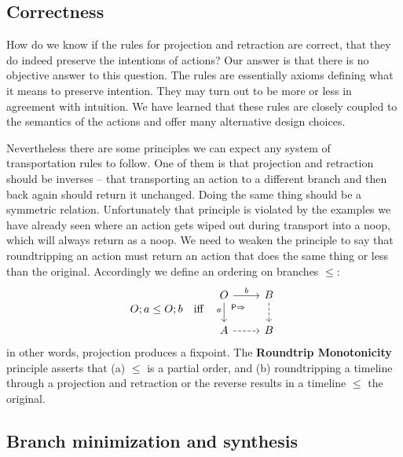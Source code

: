 \documentclass[english,submission]{programming}
\theoremstyle{definition}
\newcommand{\mathbox}[1]{\colorbox{black!10}{$#1$}}
\begin{document}

\subsection{Correctness}

How do we know if the rules for projection and retraction are correct, that they do indeed preserve the intentions of actions? Our answer is that there is no objective answer to this question. The rules are essentially axioms defining what it means to preserve intention. They may turn out to be more or less in agreement with intuition. We have learned that these rules are closely coupled to the semantics of the actions and offer many alternative design choices.

Nevertheless there are some principles we can expect any system of transportation rules to follow. One of them is that projection and retraction should be inverses -- that transporting an action to a different branch and then back again should return it unchanged. Doing the same thing should be a symmetric relation. Unfortunately that principle is violated by the examples we have already seen where an action gets wiped out during transport into a \textsf{noop}, which will always return as a \textsf{noop}. We need to weaken the principle to say that roundtripping an action must return an action that does the same thing or less than the original. Accordingly we define an ordering on branches \mathbox{\leq}:
\[
O; a \leq O; b \quad\textrm{iff} \quad
\begin{tikzcd}
	O & B \\
	A & B
	\arrow["{b}", from=1-1, to=1-2]
	\arrow["{a}"'{pos=0.4}, from=1-1, to=2-1]
	\arrow["{\textsf{P}\Rightarrow}"{description, pos=0.2}, draw=none, from=1-1, to=2-2]
	\arrow[dashed, from=1-2, to=2-2]
	\arrow[dashed, from=2-1, to=2-2]
\end{tikzcd}
\]
in other words, projection produces a fixpoint. The \textbf{Roundtrip Monotonicity} principle asserts that (a) \mathbox{\leq} is a partial order, and (b) roundtripping a timeline through a projection and retraction or the reverse results in a timeline $\leq$ the original.


\subsection{Branch minimization and synthesis}
\end{document}
